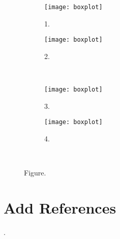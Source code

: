 \begin{figure}[htb]
    \centering
    \begin{subfigure}{0.49\textwidth}
      \texttt{[image: boxplot]}
      \caption{1.}
    \end{subfigure}
    \begin{subfigure}{0.49\textwidth}
      \texttt{[image: boxplot]}
      \caption{2.}
    \end{subfigure}\\[1mm]
    \begin{subfigure}{0.49\textwidth}
      \texttt{[image: boxplot]}
      \caption{3.}
    \end{subfigure}
    \begin{subfigure}{0.49\textwidth}
      \texttt{[image: boxplot]}
      \caption{4.}
    \end{subfigure}\\[1mm]
    \caption{Figure.}
    \label{figure: 3}
\end{figure}

\section{Add References}
\cite{xue2020online}. \citep{xue2020online}

